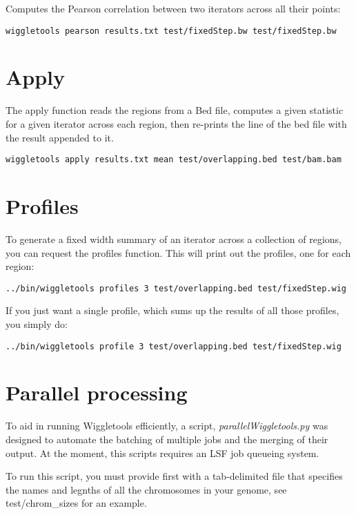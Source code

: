 \documentclass[12pt]{article}
\begin{document}
Computes the Pearson correlation between two iterators across all their points:

\begin{verbatim}
wiggletools pearson results.txt test/fixedStep.bw test/fixedStep.bw 
\end{verbatim}

\section{Apply}

The apply function reads the regions from a Bed file, computes a given statistic for a given iterator across each region, then re-prints the line of the bed file with the result appended to it.

\begin{verbatim}
wiggletools apply results.txt mean test/overlapping.bed test/bam.bam 
\end{verbatim}

\section{Profiles}

To generate a fixed width summary of an iterator across a collection of regions, you can request the profiles function. This will print out the profiles, one for each region:

\begin{verbatim}
../bin/wiggletools profiles 3 test/overlapping.bed test/fixedStep.wig
\end{verbatim}

If you just want a single profile, which sums up the results of all those profiles, you simply do:

\begin{verbatim}
../bin/wiggletools profile 3 test/overlapping.bed test/fixedStep.wig
\end{verbatim}

\section{Parallel processing}

To aid in running Wiggletools efficiently, a script, \emph{parallelWiggletools.py} was designed to automate the batching of multiple jobs and the merging of their output. At the moment, this scripts requires an LSF job queueing system.

To run this script, you must provide first with a tab-delimited file that specifies the names and legnths of all the chromosomes in your genome, see test/chrom\_sizes for an example.
\end{document}
